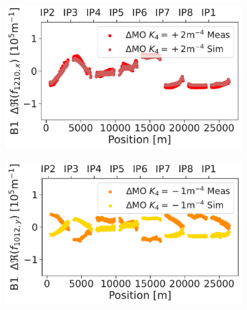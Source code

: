 \begin{figure}[!htb]
\begin{subfigure}{0.47\textwidth}
    \end{subfigure}
    \hfill
    \begin{subfigure}{0.47\textwidth}
        \includegraphics[width=\textwidth]{./images/skew_octupoles/responses_coupling/f1210_response_meas_sim_+2_REAL_smoll.pdf}
    \end{subfigure}
    \par\medskip 
    \begin{subfigure}{0.47\textwidth}
        \includegraphics[width=\textwidth]{./images/skew_octupoles/responses_coupling/f1012_response_meas_sim_-1_REAL_smoll.pdf}
    \end{subfigure}
    \hfill
    \begin{subfigure}{0.47\textwidth}

\end{subfigure}
\end{figure}

